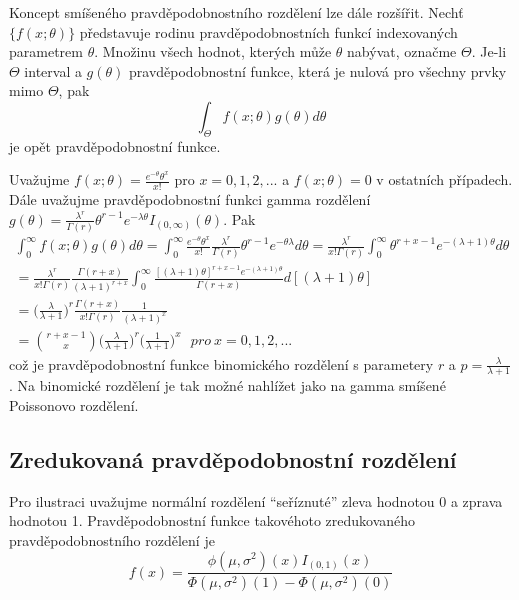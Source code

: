 Koncept smíšeného pravděpodobnostního rozdělení lze dále rozšířit. Nechť $\{f(x; \theta)\}$ představuje rodinu pravděpodobnostních funkcí indexovaných parametrem $\theta$. Množinu všech hodnot, kterých může $\theta$ nabývat, označme $\Theta$. Je-li $\Theta$ interval a $g(\theta)$ pravděpodobnostní funkce, která je nulová pro všechny prvky mimo $\Theta$, pak
\begin{equation*}
\int_{\Theta}f(x; \theta) g(\theta) d\theta
\end{equation*}
je opět pravděpodobnostní funkce.

\begin{example}
Uvažujme $f(x; \theta) = \frac{e^{-\theta}\theta^x}{x!}$ pro $x = 0, 1, 2, ...$ a $f(x; \theta) = 0$ v ostatních případech. Dále uvažujme pravděpodobnostní funkci gamma rozdělení $g(\theta) = \frac{\lambda^r}{\Gamma(r)}\theta^{r-1}e^{-\lambda \theta}I_{(0, \infty)}(\theta)$. Pak
\begin{gather*}
\int_0^{\infty}f(x;\theta)g(\theta)d\theta = \int_0^{\infty} \frac{e^{-\theta}\theta^x}{x!} \frac{\lambda^r}{\Gamma(r)}\theta^{r - 1}e^{-\theta \lambda} d \theta = \frac{\lambda^r}{x! \Gamma(r)} \int_0^{\infty} \theta^{r + x - 1} e^{-(\lambda + 1)\theta}d \theta\\
= \frac{\lambda^r}{x! \Gamma(r)} \frac{\Gamma(r + x)}{(\lambda + 1)^{r + x}}\int_0^{\infty} \frac{[(\lambda + 1)\theta]^{r + x - 1} e^{-(\lambda + 1)\theta}}{\Gamma(r + x)} d[(\lambda + 1)\theta]\\
= \Big(\frac{\lambda}{\lambda + 1}\Big)^r \frac{\Gamma(r + x)}{x!\Gamma(r)}\frac{1}{(\lambda + 1)^x}\\
= \binom{r + x - 1}{x}\Big(\frac{\lambda}{\lambda + 1}\Big)^r\Big(\frac{1}{\lambda + 1}\Big)^x ~~~\textit{pro}~x = 0, 1, 2, ...
\end{gather*}
což je pravděpodobnostní funkce binomického rozdělení s parametery $r$ a $p = \frac{\lambda}{\lambda + 1}$. Na binomické rozdělení je tak možné nahlížet jako na gamma smíšené Poissonovo rozdělení.
\end{example}

\subsection{Zredukovaná pravděpodobnostní rozdělení}

Pro ilustraci uvažujme normální rozdělení ``seříznuté'' zleva hodnotou 0 a zprava hodnotou 1. Pravděpodobnostní funkce takovéhoto zredukovaného pravděpodobnostního rozdělení je
\begin{equation*}
f(x) = \frac{\phi(\mu, \sigma^2)(x)I_{(0,1)}(x)}{\Phi(\mu, \sigma^2)(1) - \Phi(\mu, \sigma^2)(0)}
\end{equation*}


